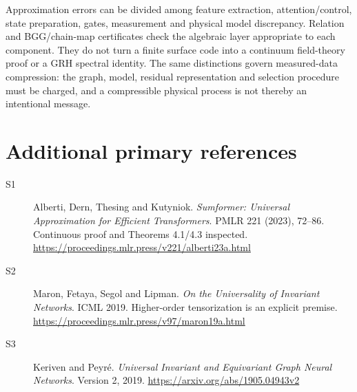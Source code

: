 Approximation errors can be divided among feature extraction, attention/control, state preparation, gates, measurement and physical model discrepancy. Relation and BGG/chain-map certificates check the algebraic layer appropriate to each component. They do not turn a finite surface code into a continuum field-theory proof or a GRH spectral identity. The same distinctions govern measured-data compression: the graph, model, residual representation and selection procedure must be charged, and a compressible physical process is not thereby an intentional message.

\section{Additional primary references}
\begin{description}
\item[S1] Alberti, Dern, Thesing and Kutyniok. \emph{Sumformer: Universal Approximation for Efficient Transformers}. PMLR 221 (2023), 72--86. Continuous proof and Theorems 4.1/4.3 inspected. \url{https://proceedings.mlr.press/v221/alberti23a.html}
\item[S2] Maron, Fetaya, Segol and Lipman. \emph{On the Universality of Invariant Networks}. ICML 2019. Higher-order tensorization is an explicit premise. \url{https://proceedings.mlr.press/v97/maron19a.html}
\item[S3] Keriven and Peyr\'e. \emph{Universal Invariant and Equivariant Graph Neural Networks}. Version 2, 2019. \url{https://arxiv.org/abs/1905.04943v2}
\end{description}

